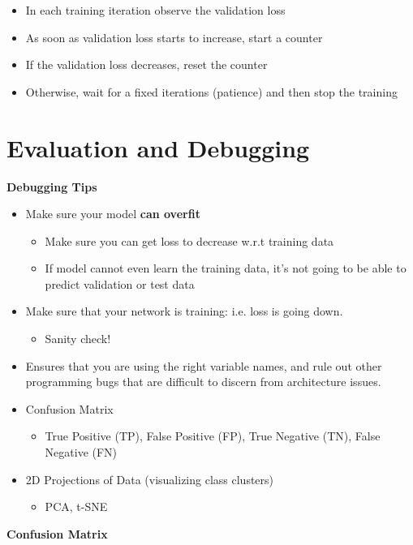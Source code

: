 \begin{itemize}
    \item In each training iteration observe the validation loss
    \item As soon as validation loss starts to increase, start a counter
    \item If the validation loss decreases, reset the counter
    \item Otherwise, wait for a fixed iterations (patience) and then stop the training
\end{itemize}

\section{Evaluation and Debugging}
\textbf{Debugging Tips}
\begin{itemize}
    \item Make sure your model \textbf{can overfit}
    \begin{itemize}
        \item Make sure you can get loss to decrease w.r.t training data
        \item If model cannot even learn the training data, it's not going to be able to predict validation or test data
    \end{itemize}
    \item Make sure that your network is training: i.e. loss is going down.
    \begin{itemize}
        \item Sanity check!
    \end{itemize}
    \item Ensures that you are using the right variable names, and rule out other programming bugs that are difficult to discern from architecture issues.
    \item Confusion Matrix
    \begin{itemize}
        \item True Positive (TP), False Positive (FP), True Negative (TN), False Negative (FN)
    \end{itemize}
    \item 2D Projections of Data (visualizing class clusters)
    \begin{itemize}
        \item PCA, t-SNE
    \end{itemize}
\end{itemize}

\noindent\textbf{Confusion Matrix}

